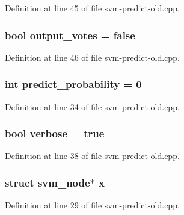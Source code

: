 Definition at line 45 of file svm-\/predict-\/old.\-cpp.

\hypertarget{svm-predict-old_8cpp_ac3602f56435c68a322553ed33804e5d1}{
\subsubsection[{output\-\_\-votes}]{\setlength{\rightskip}{0pt plus 5cm}bool output\-\_\-votes = false}}\label{svm-predict-old_8cpp_ac3602f56435c68a322553ed33804e5d1}


Definition at line 46 of file svm-\/predict-\/old.\-cpp.

\hypertarget{svm-predict-old_8cpp_a1501132f5226b295e5300d74da55a2b9}{
\subsubsection[{predict\-\_\-probability}]{\setlength{\rightskip}{0pt plus 5cm}int predict\-\_\-probability = 0}}\label{svm-predict-old_8cpp_a1501132f5226b295e5300d74da55a2b9}


Definition at line 34 of file svm-\/predict-\/old.\-cpp.

\hypertarget{svm-predict-old_8cpp_ab3f078684998b83967d507d0f453f454}{
\subsubsection[{verbose}]{\setlength{\rightskip}{0pt plus 5cm}bool verbose = true}}\label{svm-predict-old_8cpp_ab3f078684998b83967d507d0f453f454}


Definition at line 38 of file svm-\/predict-\/old.\-cpp.

\hypertarget{svm-predict-old_8cpp_a9a5b72a4065074cac5da07efb80a1e79}{
\subsubsection[{x}]{\setlength{\rightskip}{0pt plus 5cm}struct {\bf svm\-\_\-node}$\ast$ x}}\label{svm-predict-old_8cpp_a9a5b72a4065074cac5da07efb80a1e79}


Definition at line 29 of file svm-\/predict-\/old.\-cpp.

